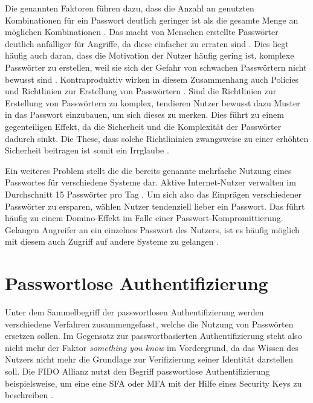 Die genannten Faktoren führen dazu, dass die Anzahl an genutzten Kombinationen für ein Passwort deutlich geringer ist als die gesamte Menge an möglichen Kombinationen \cite{boonkrong2012security}. Das macht von Menschen erstellte Passwörter deutlich anfälliger für Angriffe, da diese einfacher zu erraten sind \cite{chanda2016password}. Dies liegt häufig auch daran, dass die Motivation der Nutzer häufig gering ist, komplexe Passwörter zu erstellen, weil sie sich der Gefahr von schwachen Passwörtern nicht bewusst sind \cite{yildirim2019encouraging}. Kontraproduktiv wirken in diesem Zusammenhang auch Policies und Richtlinien zur Erstellung von Passwörtern \cite{yildirim2019encouraging}. Sind die Richtlinien zur Erstellung von Passwörtern zu komplex, tendieren Nutzer bewusst dazu Muster in das Passwort einzubauen, um sich dieses zu merken. Dies führt zu einem gegenteiligen Effekt, da die Sicherheit und die Komplexität der Passwörter dadurch sinkt. Die These, dass solche Richtlininien zwangsweise zu einer erhöhten Sicherheit beitragen ist somit ein Irrglaube \cite{yildirim2019encouraging} \cite{morii2017research}.

Ein weiteres Problem stellt die die bereits genannte mehrfache Nutzung eines Passwortes für verschiedene Systeme dar. Aktive Internet-Nutzer verwalten im Durchschnitt 15 Passwörter pro Tag \cite{ives2004domino}. Um sich also das Einprägen verschiedener Passwörter zu ersparen, wählen Nutzer tendenziell lieber ein Passwort. Das führt häufig zu einem Domino-Effekt im Falle einer Passwort-Kompromittierung. Gelangen Angreifer an ein einzelnes Passwort des Nutzers, ist es häufig möglich mit diesem auch Zugriff auf andere Systeme zu gelangen \cite{ives2004domino} \cite{morii2017research}. 


\section{Passwortlose Authentifizierung} \label{alts}

Unter dem Sammelbegriff der passwortlosen Authentifizierung werden verschiedene Verfahren zusammengefasst, welche die Nutzung von Passwörten ersetzen sollen. Im Gegensatz zur passwortbasierten Authentifizierung steht also nicht mehr der Faktor \textit{something you know} im Vordergrund, da das Wissen des Nutzers nicht mehr die Grundlage zur Verifizierung seiner Identität darstellen soll. Die \ac{FIDO} Allianz nutzt den Begriff passwortlose Authentifizierung beispielsweise, um eine eine \ac{SFA} oder \ac{MFA} mit der Hilfe eines Security Keys zu beschreiben \cite{farke2020you}. 


